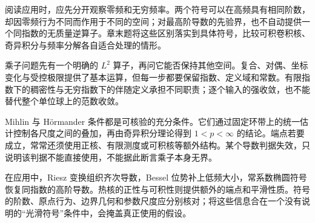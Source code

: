 \ProseParagraphBreak

阅读应用时，应先分开观察零频和无穷频率。两个符号可以在高频具有相同阶数，却因零频行为不同而作用于不同的空间；对最高阶导数的先验界，也不自动提供一个同指数的无质量逆算子。章末题将这些区别落实到具体符号，比较可积卷积核、奇异积分与频率分解各自适合处理的情形。





\begin{chaptersummary}
乘子问题先有一个明确的 \(L^2\) 算子，再问它能否保持其他空间。复合、对偶、坐标变化与受控极限提供了基本运算，但每一步都要保留指数、定义域和常数。有限指数下的稠密性与无穷指数下的伴随定义承担不同职责；逐个输入的强收敛，也不能替代整个单位球上的范数收敛。

\ProseParagraphBreak

Mihlin 与 Hörmander 条件都是可核验的充分条件。它们通过固定环带上的统一估计控制各尺度之间的叠加，再由奇异积分理论得到 \(1<p<\infty\) 的结论。端点若要成立，常常还须使用正核、有限测度或可积核等额外结构。某个导数判据失效，只说明该判据不能直接使用，不能据此断言乘子本身无界。

\ProseParagraphBreak

在应用中，Riesz 变换组织齐次导数，Bessel 位势补上低频大小，常系数椭圆符号恢复同指数的高阶导数。热核的正性与可积性则提供额外的端点和平滑性质。符号的阶数、原点行为、边界几何和参数尺度应分别核对；将这些信息合在一个没有说明的“光滑符号”条件中，会掩盖真正使用的假设。
\end{chaptersummary}

\BookExercises

